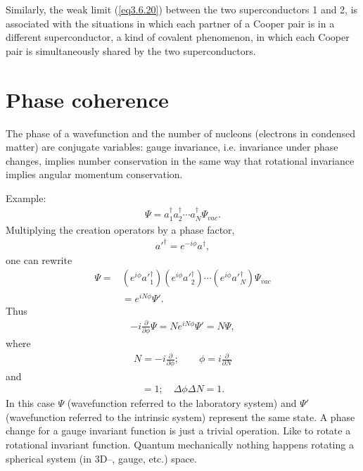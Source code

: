  
 Similarly, the weak limit (\ref{eq3.6.20}) between the two superconductors 1 and 2, is associated with the situations in which each partner of a Cooper pair is in a different superconductor, a kind of covalent phenomenon, in which each Cooper pair is simultaneously shared by the two superconductors.  
\section{Phase coherence}\label{C3AppD}
The phase of a wavefunction and the number of nucleons (electrons in condensed matter) are conjugate variables: gauge invariance, i.e. invariance under phase changes, implies number conservation in the same way that rotational invariance implies angular momentum conservation.

Example:
\begin{align*}
\Psi=a_1^\dagger a_2^\dagger\dotsb a_N^\dagger \Psi_{vac}.
\end{align*}
Multiplying the creation operators by a phase factor,
\begin{align*}
a'^\dagger= e^{-i\phi} a^\dagger,
\end{align*}
one can rewrite
\begin{align*}
\Psi=&(e^{i\phi} a'^\dagger_1)(e^{i\phi} a'^\dagger_2)\dotsb(e^{i\phi} a'^\dagger_N)\Psi_{vac}\\
&=e^{iN\phi}\Psi'.
\end{align*}
Thus
\begin{align*}
-i\frac{\partial}{\partial \phi}\Psi=Ne^{iN\phi}\Psi'=N\Psi,
\end{align*}
where
\begin{align*}
N=-i\frac{\partial}{\partial \phi};\quad\quad \phi=i\frac{\partial}{\partial N}
\end{align*}
and
\begin{align*}
[\phi,N]=1;\quad\Delta \phi \Delta N=1.
\end{align*}
In this case $\Psi$ (wavefunction referred to the laboratory system) and $\Psi'$ (wavefunction referred to the intrinsic system) represent the same state. A phase change for a gauge invariant function is just a trivial operation. Like to rotate a rotational invariant function. Quantum mechanically nothing happens rotating a spherical system (in 3D--, gauge, etc.) space.


